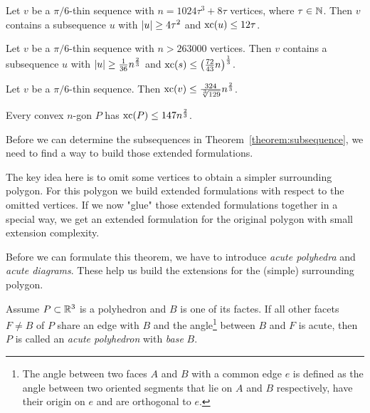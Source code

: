 \begin{theorem}\label{theorem:subsequence}
  Let $v$ be a $\pi/6$-thin sequence with $n = 1024\tau^3 + 8\tau$ vertices, where $\tau \in \mathbb{N}$. 
  Then $v$ contains a subsequence $u$ with $\lvert u\rvert \geq 4\tau^2$ and $\operatorname{xc}(u) \leq 12\tau$.
\end{theorem}

\begin{corollary}\label{corollary:subsequence}
  Let $v$ be a $\pi/6$-thin sequence with $n > 263 000$ vertices. 
  Then $v$ contains a subsequence $u$ with $\lvert u\rvert \geq \frac{1}{36} n^{\frac{2}{3}}$ and $\operatorname{xc}(s) \leq \left( \frac{72}{43}n \right)^{\frac{1}{3}}$.
\end{corollary}

\begin{corollary}\label{corollary:thin-xc}
  Let $v$ be a $\pi/6$-thin sequence. Then $\operatorname{xc}(v) \leq \frac{324}{\sqrt[3]{129}} n^{\frac{2}{3}}$.
\end{corollary}

\begin{theorem}\label{theorem:xc}
  Every convex $n$-gon $P$ has $\operatorname{xc}(P) \leq 147 n^{\frac{2}{3}}$.
\end{theorem}

Before we can determine the subsequences in Theorem~\ref{theorem:subsequence}, we need to find a way to build those extended formulations.

The key idea here is to omit some vertices to obtain a simpler surrounding polygon. For this polygon we build extended formulations with respect to the omitted vertices. If we now "glue" those extended formulations together in a special way, we get an extended formulation for the original polygon with small extension complexity.

Before we can formulate this theorem, we have to introduce \emph{acute polyhedra} and \emph{acute diagrams}. These help us build the extensions for the (simple) surrounding polygon.

\begin{definition}
  Assume $P \subset \mathbb{R}^3$ is a polyhedron and $B$ is one of its factes. If all other facets $F \neq B$ of $P$ 
  share an edge with $B$ and
  the angle\footnote{The angle between two faces $A$ and $B$ with a common edge $e$ is defined as the angle between two oriented segments that lie on $A$ and $B$ respectively, have their origin on $e$ and are orthogonal to $e$.} between $B$ and $F$ is acute,
  then $P$ is called an \emph{acute polyhedron} with \emph{base} $B$.
\end{definition}

